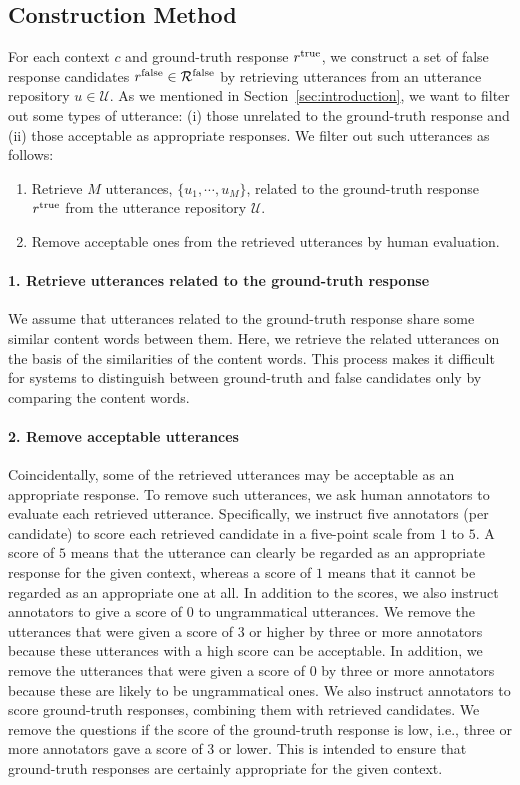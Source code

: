 \documentclass[11pt,a4paper]{article}
\begin{document}
\subsection{Construction Method}
\label{subsec:method}

For each context $c$ and ground-truth response $r^{\rm true}$, we construct a set of false response candidates $r^{\rm false} \in \mathcal{R}^{\rm false}$ by retrieving utterances from an utterance repository $u \in \mathcal{U}$.
As we mentioned in Section~\ref{sec:introduction}, we want to filter out some types of utterance: (i) those unrelated to the ground-truth response and (ii) those acceptable as appropriate responses.
We filter out such utterances as follows:
\begin{enumerate}
    \setlength{\parskip}{0cm}
    \setlength{\itemsep}{0cm}
    \item Retrieve $M$ utterances, $\{ u_1, \cdots, u_M \}$, related to the ground-truth response $r^{\rm true}$ from the utterance repository $\mathcal{U}$.
    \item Remove acceptable ones from the retrieved utterances by human evaluation.
\end{enumerate}

\paragraph{1. Retrieve utterances related to the ground-truth response}
We assume that utterances related to the ground-truth response share some similar content words between them.
Here, we retrieve the related utterances on the basis of the similarities of the content words.
This process makes it difficult for systems to distinguish between ground-truth and false candidates only by comparing the content words.

\paragraph{2. Remove acceptable utterances}
Coincidentally, some of the retrieved utterances may be acceptable as an appropriate response.
To remove such utterances, we ask human annotators to evaluate each retrieved utterance.
Specifically, we instruct five annotators (per candidate) to score each retrieved candidate in a five-point scale from $1$ to $5$.
A score of $5$ means that the utterance can clearly be regarded as an appropriate response for the given context, whereas a score of $1$ means that it cannot be regarded as an appropriate one at all.
In addition to the scores, we also instruct annotators to give a score of $0$ to ungrammatical utterances.
We remove the utterances that were given a score of $3$ or higher by three or more annotators because these utterances with a high score can be acceptable.
In addition, we remove the utterances that were given a score of $0$ by three or more annotators because these are likely to be ungrammatical ones.
We also instruct annotators to score ground-truth responses, combining them with retrieved candidates.
We remove the questions if the score of the ground-truth response is low, i.e., three or more annotators gave a score of $3$ or lower.
This is intended to ensure that ground-truth responses are certainly appropriate for the given context.
\end{document}
